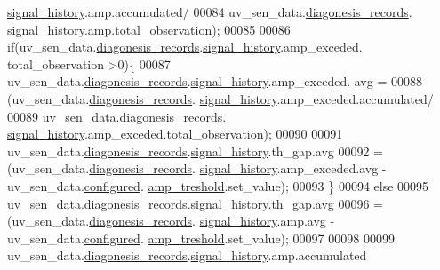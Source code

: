 \begin{DoxyCode}
      \hyperlink{a00017_affb63906d23cb1cb7787d61eaaedfb60}{signal\_history}.amp.accumulated/
00084                         uv\_sen\_data.\hyperlink{a00035_a7ae905b560513ad201e58c2f63375030}{diagonesis\_records}.
      \hyperlink{a00017_affb63906d23cb1cb7787d61eaaedfb60}{signal\_history}.amp.total\_observation);
00085 
00086             \textcolor{keywordflow}{if}(uv\_sen\_data.\hyperlink{a00035_a7ae905b560513ad201e58c2f63375030}{diagonesis\_records}.\hyperlink{a00017_affb63906d23cb1cb7787d61eaaedfb60}{signal\_history}.amp\_exceded.
      total\_observation >0)\{
00087                 uv\_sen\_data.\hyperlink{a00035_a7ae905b560513ad201e58c2f63375030}{diagonesis\_records}.\hyperlink{a00017_affb63906d23cb1cb7787d61eaaedfb60}{signal\_history}.amp\_exceded.
      avg =
00088                         (uv\_sen\_data.\hyperlink{a00035_a7ae905b560513ad201e58c2f63375030}{diagonesis\_records}.
      \hyperlink{a00017_affb63906d23cb1cb7787d61eaaedfb60}{signal\_history}.amp\_exceded.accumulated/
00089                         uv\_sen\_data.\hyperlink{a00035_a7ae905b560513ad201e58c2f63375030}{diagonesis\_records}.
      \hyperlink{a00017_affb63906d23cb1cb7787d61eaaedfb60}{signal\_history}.amp\_exceded.total\_observation);
00090 
00091                 uv\_sen\_data.\hyperlink{a00035_a7ae905b560513ad201e58c2f63375030}{diagonesis\_records}.\hyperlink{a00017_affb63906d23cb1cb7787d61eaaedfb60}{signal\_history}.th\_gap.avg
00092                     = (uv\_sen\_data.\hyperlink{a00035_a7ae905b560513ad201e58c2f63375030}{diagonesis\_records}.
      \hyperlink{a00017_affb63906d23cb1cb7787d61eaaedfb60}{signal\_history}.amp\_exceded.avg - uv\_sen\_data.\hyperlink{a00035_a94b2d1f6ea4ab334c74d24984dd27843}{configured}.
      \hyperlink{a00021_a4b3bbfb0267daea1432f2603825ade62}{amp\_treshold}.set\_value);
00093             \}
00094             \textcolor{keywordflow}{else}
00095             uv\_sen\_data.\hyperlink{a00035_a7ae905b560513ad201e58c2f63375030}{diagonesis\_records}.\hyperlink{a00017_affb63906d23cb1cb7787d61eaaedfb60}{signal\_history}.th\_gap.avg
00096                     = (uv\_sen\_data.\hyperlink{a00035_a7ae905b560513ad201e58c2f63375030}{diagonesis\_records}.
      \hyperlink{a00017_affb63906d23cb1cb7787d61eaaedfb60}{signal\_history}.amp.avg - uv\_sen\_data.\hyperlink{a00035_a94b2d1f6ea4ab334c74d24984dd27843}{configured}.
      \hyperlink{a00021_a4b3bbfb0267daea1432f2603825ade62}{amp\_treshold}.set\_value);
00097 
00098 
00099               uv\_sen\_data.\hyperlink{a00035_a7ae905b560513ad201e58c2f63375030}{diagonesis\_records}.\hyperlink{a00017_affb63906d23cb1cb7787d61eaaedfb60}{signal\_history}.amp.accumulated

\end{DoxyCode}
